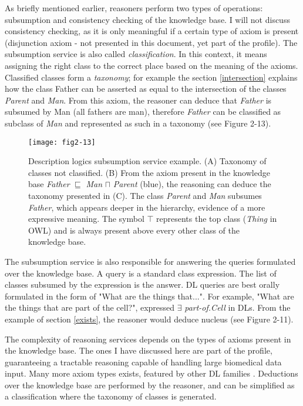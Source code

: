 As briefly mentioned earlier, reasoners perform two types of operations: subsumption and consistency checking of the knowledge base. I will not discuss consistency checking, as it is only meaningful if a certain type of axiom is present (disjunction axiom - not presented in this document, yet part of the  profile). The subsumption service is also called \emph{classification}. In this context, it means assigning the right class to the correct place based on the meaning of the axioms. Classified classes form a \emph{taxonomy}; for example the section \ref{intersection} explains how the class Father can be asserted as equal to the intersection of the classes \emph{Parent} and \emph{Man}. From this axiom, the reasoner can deduce that \emph{Father} is subsumed by Man (all fathers are man), therefore \emph{Father} can be classified as subclass of \emph{Man} and represented as such in a taxonomy (see Figure 2-13).

\begin{figure}[ht]
    \centering
    \texttt{[image: fig2-13]}
    \caption{Description logics subsumption service example. (A) Taxonomy of classes not classified. (B) From the axiom present in the knowledge base \emph{Father} $ \sqsubseteq $ \emph{Man} $ \sqcap $ \emph{Parent} (blue), the reasoning can deduce the taxonomy presented in (C). The class \emph{Parent} and \emph{Man} subsumes \emph{Father}, which appears deeper in the hierarchy, evidence of a more expressive meaning. The symbol $ \top $ represents the top class (\emph{Thing} in OWL) and is always present above every other class of the knowledge base.}
    \label{fig2-13}
\end{figure}

The subsumption service is also responsible for answering the queries formulated over the knowledge base. A query is a standard class expression. The list of classes subsumed by the expression is the answer. DL queries are best orally formulated in the form of "What are the things that...". For example, "What are the things that are part of the cell?", expressed $ \exists $ \emph{part-of.Cell} in DLs. From the example of section \ref{exists}, the reasoner would deduce nucleus (see Figure 2-11).

The complexity of reasoning services depends on the types of axioms present in the knowledge base. The ones I have discussed here are part of the  profile, guaranteeing a tractable reasoning capable of handling large biomedical data input. Many more axiom types exists, featured by other DL families \citep{krotzsch2012owl}. Deductions over the knowledge base are performed by the reasoner, and can be simplified as a classification where the taxonomy of classes is generated. 

